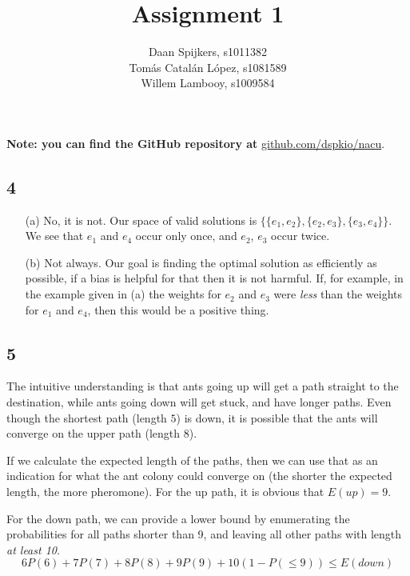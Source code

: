 \documentclass{scrartcl}
\title{Assignment 1}
\author{Daan Spijkers, s1011382\\ Tomás Catalán López, s1081589\\ Willem Lambooy, s1009584}
\begin{document}
\maketitle

\textbf{Note: you can find the GitHub repository at}
\url{github.com/dspkio/nacu}.

\subsection*{4}

\begin{itemize}

  \item[(a)]
    No, it is not. Our space of valid solutions is $\{\{e_1, e_2\}, \{e_2,
    e_3\}, \{e_3, e_4\}\}$. We see that $e_1$ and $e_4$ occur only once,
    and $e_2$, $e_3$ occur twice.

  \item[(b)]
    Not always. Our goal is finding the optimal solution as efficiently as
    possible, if a bias is helpful for that then it is not harmful. If,
    for example, in the example given in (a) the weights for $e_2$ and
    $e_3$ were \emph{less} than the weights for $e_1$ and $e_4$, then this
    would be a positive thing.

\end{itemize}

\subsection*{5}
The intuitive understanding is that ants going up will get a path straight
to the destination, while ants going down will get stuck, and have longer
paths. Even though the shortest path (length $5$) is down, it is possible
that the ants will converge on the upper path (length $8$).

If we calculate the expected length of the paths, then we can use that as
an indication for what the ant colony could converge on (the shorter the
expected length, the more pheromone). For the up path,
it is obvious that $E(up) = 9$.

For the down path, we can provide a lower bound by enumerating the
probabilities for all paths shorter than 9, and leaving all other paths
with length \emph{at least 10}.
\begin{equation}
  6  P(6) + 7  P(7) + 8  P(8) + 9  P(9) + 10(1 - P(\le9)) \le E(down)
\end{equation}
\end{document}
